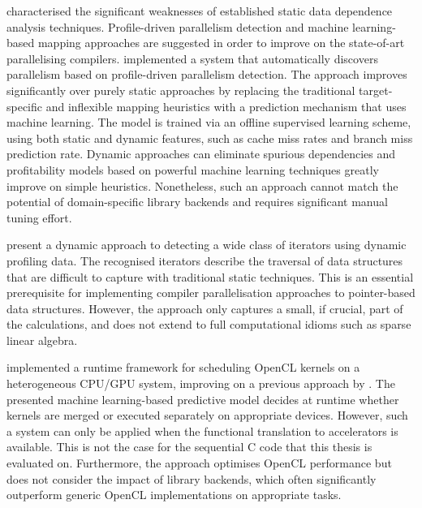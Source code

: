     \citet{Tournavitis:2009:THA:1542476.1542496} characterised the significant
    weaknesses of established static data dependence analysis techniques.
    Profile-driven parallelism detection and machine learning-based mapping
    approaches are suggested in order to improve on the state-of-art
    parallelising compilers.
    \citet{Wang:2014:IPP:2591460.2579561} implemented a system that
    automatically discovers parallelism based on profile-driven parallelism
    detection.
    The approach improves significantly over purely static approaches by
    replacing the traditional target-specific and inflexible mapping heuristics
    with a prediction mechanism that uses machine learning.
    The model is trained via an offline supervised learning scheme, using both
    static and dynamic features, such as cache miss rates and branch miss
    prediction rate.
    Dynamic approaches can eliminate spurious dependencies and profitability
    models based on powerful machine learning techniques greatly improve on
    simple heuristics.
    Nonetheless, such an approach cannot match the potential of domain-specific
    library backends and requires significant manual tuning effort.

    \citet{Manilov:2018:GPI:3178372.3179511} present a dynamic approach to
    detecting a wide class of iterators using dynamic profiling data.
    The recognised iterators describe the traversal of data structures that are
    difficult to capture with traditional static techniques.
    This is an essential prerequisite for implementing compiler parallelisation
    approaches to pointer-based data structures.
    However, the approach only captures a small, if crucial, part of the
    calculations, and does not extend to full computational idioms such
    as sparse linear algebra.

    \citet{Wen:2017:MSM:3038228.3038235} implemented a runtime framework for
    scheduling OpenCL kernels on a heterogeneous CPU/GPU system, improving on
    a previous approach by \citet{7116910}.
    The presented machine learning-based predictive model decides at runtime
    whether kernels are merged or executed separately on appropriate devices.
    However, such a system can only be applied when the functional translation
    to accelerators is available.
    This is not the case for the sequential C code that this thesis is evaluated
    on.
    Furthermore, the approach optimises OpenCL performance but does not consider
    the impact of library backends, which often significantly outperform generic
    OpenCL implementations on appropriate tasks.

